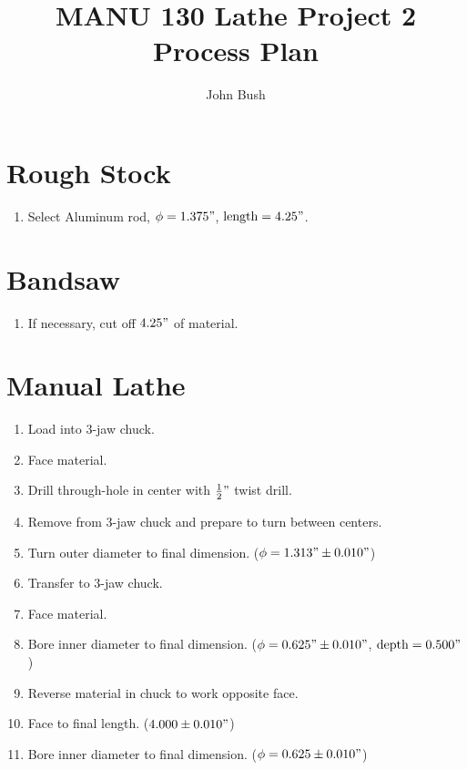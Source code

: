 \documentclass{article}
\begin{document}
\title{MANU 130 Lathe Project 2 Process Plan}
\author{John Bush}

\maketitle

\section*{Rough Stock}
\begin{enumerate}
	\item Select Aluminum rod, $\phi = 1.375"$, $\text{length} = 4.25"$.
\end{enumerate}

\section*{Bandsaw}
\begin{enumerate}[resume]
	\item If necessary, cut off $4.25"$ of material.
\end{enumerate}

\section*{Manual Lathe}
\begin{enumerate}[resume]
	\item Load into 3-jaw chuck.

	\item Face material.

	\item Drill through-hole in center with $\frac{1}{2}"$ twist drill.

	\item Remove from 3-jaw chuck and prepare to turn between centers.

	\item Turn outer diameter to final dimension. ($\phi = 1.313" \pm 0.010"$)

	\item Transfer to 3-jaw chuck.

	\item Face material.

	\item Bore inner diameter to final dimension. ($\phi = 0.625" \pm 0.010"$, $\text{depth} = 0.500"$)

	\item Reverse material in chuck to work opposite face.

	\item Face to final length. ($4.000 \pm 0.010"$)

	\item Bore inner diameter to final dimension. ($\phi = 0.625 \pm 0.010"$)
\end{enumerate}
\end{document}
